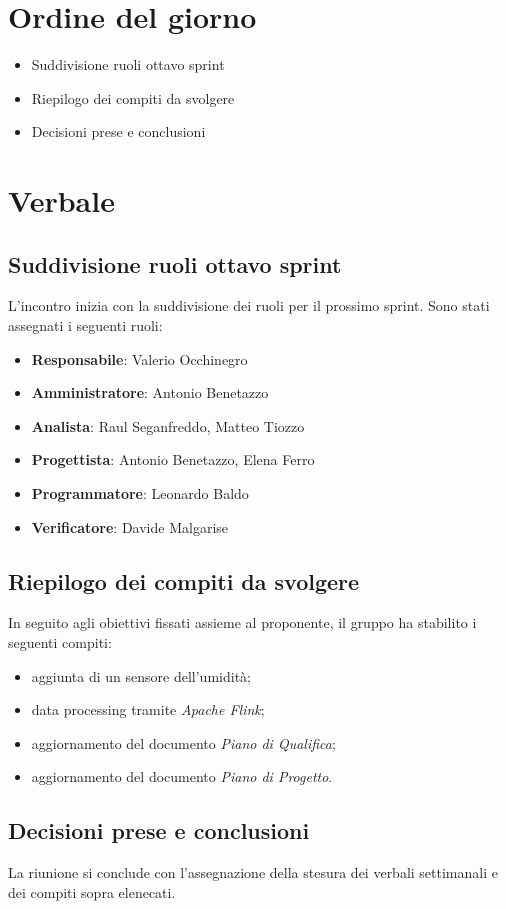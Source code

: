 \documentclass[italian,12pt]{article}
\begin{document}
\section{Ordine del giorno}

\begin{itemize}
	\item Suddivisione ruoli ottavo sprint
	\item Riepilogo dei compiti da svolgere
	\item Decisioni prese e conclusioni
\end{itemize}

\newpage

\section{Verbale}

\subsection{Suddivisione ruoli ottavo sprint}
L'incontro inizia con la suddivisione dei ruoli per il prossimo sprint.
Sono stati assegnati i seguenti ruoli:
\begin{itemize}
	\item \textbf{Responsabile}: Valerio Occhinegro
	\item \textbf{Amministratore}: Antonio Benetazzo
	\item \textbf{Analista}: Raul Seganfreddo, Matteo Tiozzo
	\item \textbf{Progettista}: Antonio Benetazzo, Elena Ferro
	\item \textbf{Programmatore}: Leonardo Baldo
	\item \textbf{Verificatore}: Davide Malgarise
\end{itemize}

\subsection{Riepilogo dei compiti da svolgere}
In seguito agli obiettivi fissati assieme al proponente, il gruppo ha stabilito i seguenti compiti:
\begin{itemize}
	\item aggiunta di un sensore dell'umidità;
	\item data processing tramite \textit{Apache Flink};
	\item aggiornamento del documento \textit{Piano di Qualifica};
	\item aggiornamento del documento \textit{Piano di Progetto}.
\end{itemize}

\subsection{Decisioni prese e conclusioni}
La riunione si conclude con l'assegnazione della stesura dei verbali settimanali e dei compiti sopra elenecati.
\end{document}
